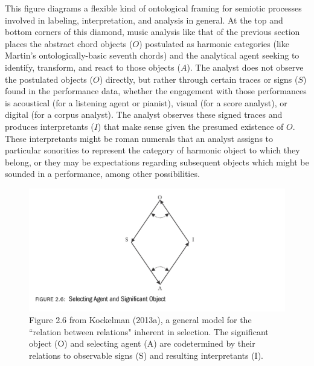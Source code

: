This figure diagrams a flexible kind of ontological framing for semiotic processes involved in labeling, interpretation, and analysis in general.  At the top and bottom corners of this diamond, music analysis like that of the previous section places the abstract chord objects ($O$) postulated as harmonic categories (like Martin's ontologically-basic seventh chords) and the analytical agent seeking to identify, transform, and react to those objects ($A$).  The analyst does not observe the postulated objects ($O$) directly, but rather through certain traces or signs ($S$) found in the performance data, whether the engagement with those performances is acoustical (for a listening agent or pianist), visual (for a score analyst), or digital (for a corpus analyst).  The analyst observes these signed traces and produces interpretants ($I$) that make sense given the presumed existence of $O$.  These interpretants might be roman numerals that an analyst assigns to particular sonorities to represent the category of harmonic object to which they belong, or they may be expectations regarding subsequent objects which might be sounded in a performance, among other possibilities.

\begin{figure}
	\caption{Figure 2.6 from Kockelman (2013a), a general model for the ``relation between relations" inherent in selection.  The significant object (O) and selecting agent (A) are codetermined by their relations to observable signs (S) and resulting interpretants (I).}
	\label{kockelman}
	\centering
	\includegraphics[width=6in]{kockelman_model.jpg}
\end{figure}

